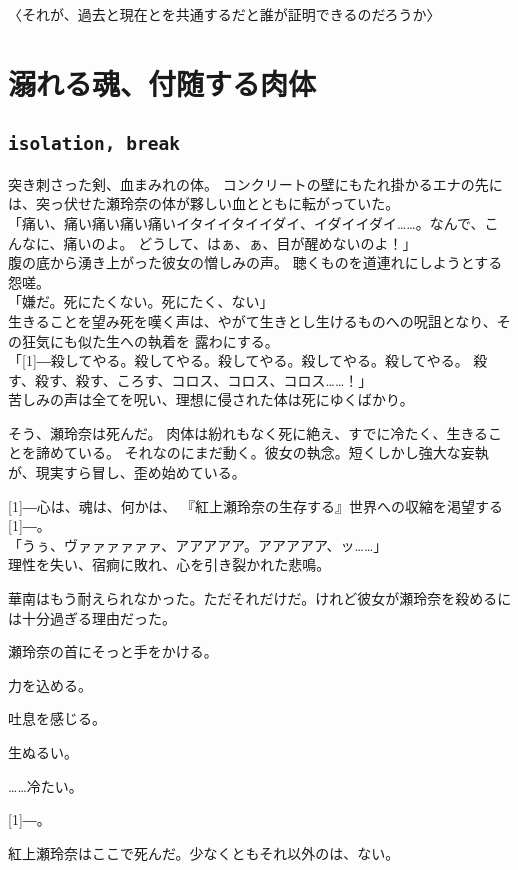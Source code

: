 \documentclass[autodetect-engine,dvipdfmx-if-dvi,a5paper,ja=standard,twoside,titlepage,final,twocolumn]{ltjtbook}
\begin{document}
〈それが、過去と現在とを共通するだと誰が証明できるのだろうか〉

\chapter{\rm 溺れる魂、付随する肉体}
\section{\tt \large isolation, break}
突き刺さった剣、血まみれの体。
コンクリートの壁にもたれ掛かるエナの先には、突っ伏せた瀬玲奈の体が夥しい血とともに転がっていた。\\
「痛い、痛い痛い痛い痛いイタイイタイイダイ、イダイイダイ……。なんで、こんなに、痛いのよ。
どうして、はぁ、ぁ、目が醒めないのよ！」\\
腹の底から湧き上がった彼女の憎しみの声。
聴くものを道連れにしようとする怨嗟。\\
「嫌だ。死にたくない。死にたく、ない」\\
生きることを望み死を嘆く声は、やがて生きとし生けるものへの呪詛となり、その狂気にも似た生への執着を
露わにする。\\
「\scalebox{3}[1]{―}殺してやる。殺してやる。殺してやる。殺してやる。殺してやる。
殺す、殺す、殺す、ころす、コロス、コロス、コロス……！」\\
苦しみの声は全てを呪い、理想に侵された体は死にゆくばかり。

そう、瀬玲奈は死んだ。
肉体は紛れもなく死に絶え、すでに冷たく、生きることを諦めている。
それなのにまだ動く。彼女の執念。短くしかし強大な妄執が、現実すら冒し、歪め始めている。

\scalebox{3}[1]{―}心は、魂は、何かは、
『紅上瀬玲奈の生存する』世界への収縮を渇望する\scalebox{3}[1]{―}。\\
「うぅ、ヴァァァァァァ、アアアアア。アアアアア、ッ……」\\
理性を失い、宿痾に敗れ、心を引き裂かれた悲鳴。

華南はもう耐えられなかった。ただそれだけだ。けれど彼女が瀬玲奈を殺めるには十分過ぎる理由だった。

瀬玲奈の首にそっと手をかける。

力を込める。

吐息を感じる。

生ぬるい。

……冷たい。

\scalebox{3}[1]{―}。

紅上瀬玲奈はここで死んだ。少なくともそれ以外のは、ない。\\
\end{document}
